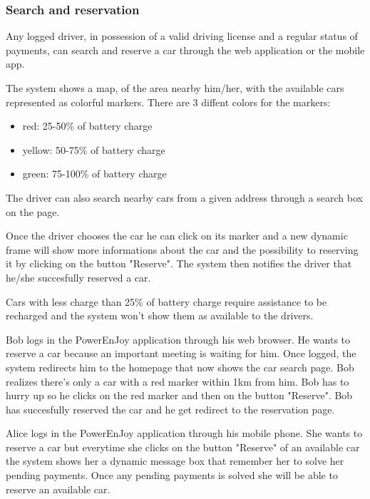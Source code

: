 \subsubsection{Search and reservation}

Any logged driver, in possession of a valid driving license and a regular status of payments, can search and reserve a car through the web application or the mobile app.

The system shows a map, of the area nearby him/her, with the available cars represented as colorful markers. There are 3 diffent colors for the markers:
\begin{itemize}
	\item red: 25-50\% of battery charge
	\item yellow: 50-75\% of battery charge
	\item green: 75-100\% of battery charge
\end{itemize}
The driver can also search nearby cars from a given address through a search box on the page.

Once the driver chooses the car he can click on its marker and a new dynamic frame will show more informations about the car and the possibility to reserving it by clicking on the button "Reserve".
The system then notifies the driver that he/she succesfully reserved a car.

Cars with less charge than 25\% of battery charge require assistance to be recharged and the system won't show them as available to the drivers. 


Bob logs in the PowerEnJoy application through his web browser. He wants to reserve a car because an important meeting is waiting for him. Once logged, the system redirects him to the homepage that now shows the car search page. Bob realizes there's only a car with a red marker within 1km from him. Bob has to hurry up so he clicks on the red marker and then on the button "Reserve". Bob has succesfully reserved the car and he get redirect to the reservation page.

Alice logs in the PowerEnJoy application through his mobile phone. She wants to reserve a car but everytime she clicks on the button "Reserve" of an available car the system shows her a dynamic message box that remember her to solve her pending payments. Once any pending payments is solved she will be able to reserve an available car.

